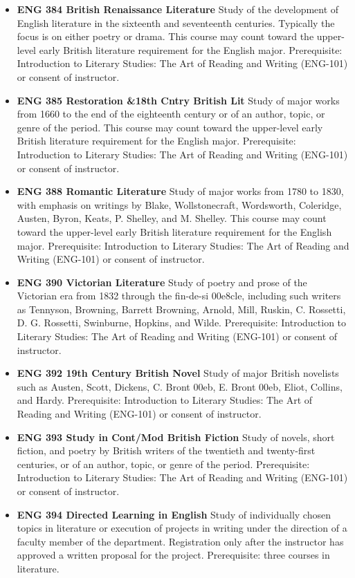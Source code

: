 \documentclass[
  letterpaper,
]{scrbook}
\begin{document}
\begin{itemize}
  (ENG-101) or consent of instructor.\\
\item
  \textbf{ENG 384 British Renaissance Literature} Study of the
  development of English literature in the sixteenth and seventeenth
  centuries. Typically the focus is on either poetry or drama. This
  course may count toward the upper-level early British literature
  requirement for the English major. Prerequisite: Introduction to
  Literary Studies: The Art of Reading and Writing (ENG-101) or consent
  of instructor.\\
\item
  \textbf{ENG 385 Restoration \&18th Cntry British Lit} Study of major
  works from 1660 to the end of the eighteenth century or of an author,
  topic, or genre of the period. This course may count toward the
  upper-level early British literature requirement for the English
  major. Prerequisite: Introduction to Literary Studies: The Art of
  Reading and Writing (ENG-101) or consent of instructor.\\
\item
  \textbf{ENG 388 Romantic Literature} Study of major works from 1780 to
  1830, with emphasis on writings by Blake, Wollstonecraft, Wordsworth,
  Coleridge, Austen, Byron, Keats, P. Shelley, and M. Shelley. This
  course may count toward the upper-level early British literature
  requirement for the English major. Prerequisite: Introduction to
  Literary Studies: The Art of Reading and Writing (ENG-101) or consent
  of instructor.\\
\item
  \textbf{ENG 390 Victorian Literature} Study of poetry and prose of the
  Victorian era from 1832 through the fin-de-si 00e8cle, including such
  writers as Tennyson, Browning, Barrett Browning, Arnold, Mill, Ruskin,
  C. Rossetti, D. G. Rossetti, Swinburne, Hopkins, and Wilde.
  Prerequisite: Introduction to Literary Studies: The Art of Reading and
  Writing (ENG-101) or consent of instructor.\\
\item
  \textbf{ENG 392 19th Century British Novel} Study of major British
  novelists such as Austen, Scott, Dickens, C. Bront 00eb, E. Bront
  00eb, Eliot, Collins, and Hardy. Prerequisite: Introduction to
  Literary Studies: The Art of Reading and Writing (ENG-101) or consent
  of instructor.\\
\item
  \textbf{ENG 393 Study in Cont/Mod British Fiction} Study of novels,
  short fiction, and poetry by British writers of the twentieth and
  twenty-first centuries, or of an author, topic, or genre of the
  period. Prerequisite: Introduction to Literary Studies: The Art of
  Reading and Writing (ENG-101) or consent of instructor.\\
\item
  \textbf{ENG 394 Directed Learning in English} Study of individually
  chosen topics in literature or execution of projects in writing under
  the direction of a faculty member of the department. Registration only
  after the instructor has approved a written proposal for the project.
  Prerequisite: three courses in literature.
\end{itemize}
\end{document}
